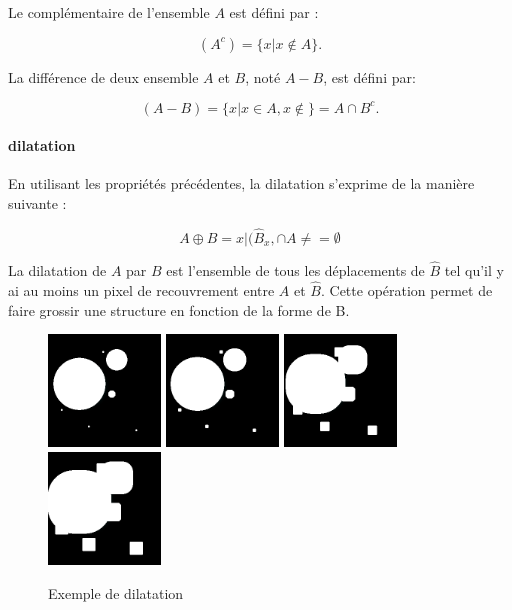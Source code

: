 {Le complémentaire de l'ensemble $A$ est défini par :

\begin{equation}
  (A^c) = \{x|x \not\in A\}. 
\end{equation}

La différence de deux ensemble $A$ et $B$, noté $A - B$, est défini par:

\begin{equation}
  (A-B) = \{x|x \in A, x\not\in \} = A \cap B^c.  
\end{equation}


\paragraph{dilatation}
En utilisant les propriétés précédentes, la dilatation s'exprime de la manière suivante :

\begin{equation}
 A \oplus B = {x|(\widehat{B}_x, \cap A \neq = \emptyset }
\end{equation}

La dilatation de $A$ par $B$ est l'ensemble de tous les déplacements de $\widehat{B}$ tel qu'il y ai au moins un pixel de recouvrement entre $A$ et $\widehat{B}$. Cette opération permet de faire grossir une structure en fonction de la forme de B.

\begin{figure}
  \centering
  \includegraphics[height=3cm]{Images/morpho_init.png}
  \includegraphics[height=3cm]{Images/morpho_dilate_k5.png}
  \includegraphics[height=3cm]{Images/morpho_dilate_k21.png}
  \includegraphics[height=3cm]{Images/morpho_dilate_k31.png}
  \label{fig:morpho_dilation}
  \caption{Exemple de dilatation}
\end{figure}

}
